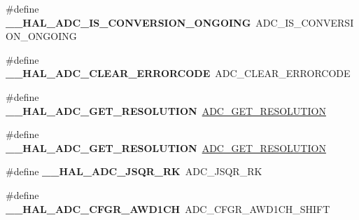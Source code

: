 \begin{DoxyCompactItemize}
\item 
\#define {\bfseries \+\_\+\+\_\+\+H\+A\+L\+\_\+\+A\+D\+C\+\_\+\+I\+S\+\_\+\+C\+O\+N\+V\+E\+R\+S\+I\+O\+N\+\_\+\+O\+N\+G\+O\+I\+NG}~A\+D\+C\+\_\+\+I\+S\+\_\+\+C\+O\+N\+V\+E\+R\+S\+I\+O\+N\+\_\+\+O\+N\+G\+O\+I\+NG\hypertarget{group___h_a_l___a_d_c___aliased___macros_ga64acf0d02a8ef5df5644c4232cef1fca}{}\label{group___h_a_l___a_d_c___aliased___macros_ga64acf0d02a8ef5df5644c4232cef1fca}

\item 
\#define {\bfseries \+\_\+\+\_\+\+H\+A\+L\+\_\+\+A\+D\+C\+\_\+\+C\+L\+E\+A\+R\+\_\+\+E\+R\+R\+O\+R\+C\+O\+DE}~A\+D\+C\+\_\+\+C\+L\+E\+A\+R\+\_\+\+E\+R\+R\+O\+R\+C\+O\+DE\hypertarget{group___h_a_l___a_d_c___aliased___macros_ga18c93f7ab9df4bb73371bbe50a131d6d}{}\label{group___h_a_l___a_d_c___aliased___macros_ga18c93f7ab9df4bb73371bbe50a131d6d}

\item 
\#define {\bfseries \+\_\+\+\_\+\+H\+A\+L\+\_\+\+A\+D\+C\+\_\+\+G\+E\+T\+\_\+\+R\+E\+S\+O\+L\+U\+T\+I\+ON}~\hyperlink{group___a_d_c___private___macros_gae2da95074db4dd0418c1dd1f13ad7970}{A\+D\+C\+\_\+\+G\+E\+T\+\_\+\+R\+E\+S\+O\+L\+U\+T\+I\+ON}\hypertarget{group___h_a_l___a_d_c___aliased___macros_gaadc60b61ddd4d5572f3a4c6dbc0520a6}{}\label{group___h_a_l___a_d_c___aliased___macros_gaadc60b61ddd4d5572f3a4c6dbc0520a6}

\item 
\#define {\bfseries \+\_\+\+\_\+\+H\+A\+L\+\_\+\+A\+D\+C\+\_\+\+G\+E\+T\+\_\+\+R\+E\+S\+O\+L\+U\+T\+I\+ON}~\hyperlink{group___a_d_c___private___macros_gae2da95074db4dd0418c1dd1f13ad7970}{A\+D\+C\+\_\+\+G\+E\+T\+\_\+\+R\+E\+S\+O\+L\+U\+T\+I\+ON}\hypertarget{group___h_a_l___a_d_c___aliased___macros_gaadc60b61ddd4d5572f3a4c6dbc0520a6}{}\label{group___h_a_l___a_d_c___aliased___macros_gaadc60b61ddd4d5572f3a4c6dbc0520a6}

\item 
\#define {\bfseries \+\_\+\+\_\+\+H\+A\+L\+\_\+\+A\+D\+C\+\_\+\+J\+S\+Q\+R\+\_\+\+RK}~A\+D\+C\+\_\+\+J\+S\+Q\+R\+\_\+\+RK\hypertarget{group___h_a_l___a_d_c___aliased___macros_ga3f3d0f19ef64dab8816b7e4d563da42c}{}\label{group___h_a_l___a_d_c___aliased___macros_ga3f3d0f19ef64dab8816b7e4d563da42c}

\item 
\#define {\bfseries \+\_\+\+\_\+\+H\+A\+L\+\_\+\+A\+D\+C\+\_\+\+C\+F\+G\+R\+\_\+\+A\+W\+D1\+CH}~A\+D\+C\+\_\+\+C\+F\+G\+R\+\_\+\+A\+W\+D1\+C\+H\+\_\+\+S\+H\+I\+FT\hypertarget{group___h_a_l___a_d_c___aliased___macros_gaf2b93300d6c91bbe5a0253368ade466f}{}\label{group___h_a_l___a_d_c___aliased___macros_gaf2b93300d6c91bbe5a0253368ade466f}


\end{DoxyCompactItemize}
